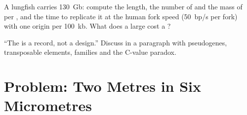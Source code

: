 \begin{exercise}[$\star\star\star$]\label{exo:b1:genomes:11}
A lungfish  carries \qty{130}{Gb}: compute the  length, the
number of  and the mass of  per , and the time
to replicate it at the human fork speed (\qty{50}{bp/s} per fork) with
one origin per \qty{100}{kb}. What does a large  cost a ?
\end{exercise}

\begin{exercise}[$\star\star\star$]\label{exo:b1:genomes:12}
``The  is a record, not a design.'' Discuss in a paragraph with
pseudogenes, transposable elements,  families and the C-value
paradox.
\end{exercise}

\section{Problem: Two Metres in Six Micrometres}

